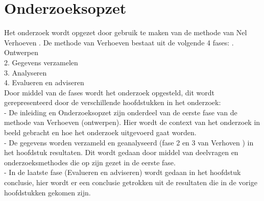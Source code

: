 \section{Onderzoeksopzet}
Het onderzoek wordt opgezet door gebruik te maken van de  methode van Nel Verhoeven \Parencite{Verhoeven}.
De methode van Verhoeven bestaat uit de volgende 4 fases:
. Ontwerpen \\
2. Gegevens verzamelen \\
3. Analyseren \\
4. Evalueren en adviseren \\
\whitespace
Door middel van de fases wordt het onderzoek opgesteld, dit wordt gerepresenteerd door de verschillende hoofdstukken in het onderzoek: \\
- De inleiding en Onderzoeksopzet zijn onderdeel van de eerste fase van de methode van Verhoeven (ontwerpen).
Hier wordt de context van het onderzoek in beeld gebracht en hoe het onderzoek uitgevoerd gaat worden. \\ 
- De gegevens worden verzameld en geanalyseerd (fase 2 en 3 van Verhoven \Parencite{Verhoeven}) in het hoofdstuk resultaten.
Dit wordt gedaan door middel van deelvragen en onderzoeksmethodes die op zijn gezet in de eerste fase.\\ 
- In de laatste fase (Evalueren en adviseren) wordt gedaan in het hoofdstuk conclusie, hier wordt er een conclusie getrokken uit de resultaten die in de vorige hoofdstukken gekomen zijn.
